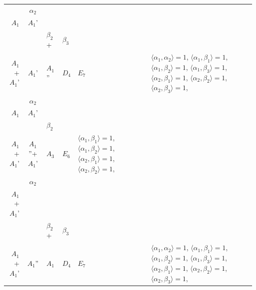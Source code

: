 \documentclass[12pt]{report}
\begin{document}
\begin{appendix}
{\begin{longtable}{rcl p{1cm}p{1cm}p{3cm} }
\begin{tabular}{cc}$\alpha_1$+ & $\alpha_2$\\\tiny{ $A_1$ } & \tiny{ $A_1$' }\end{tabular} &\begin{tabular}{c} = \\~ \end{tabular} & \begin{tabular}{ccc}$\beta_1$+ & $\beta_2$+ & $\beta_3$\\\tiny{ $A_1$+$A_1$' } & \tiny{ $A_1$' } & \tiny{ $A_1$'' }\end{tabular} & $D_4$ & $E_7$ & $\langle\alpha_1, \alpha_2\rangle=1$,  $\langle\alpha_1, \beta_1\rangle=1$, $\langle\alpha_1, \beta_2\rangle=1$, $\langle\alpha_1, \beta_3\rangle=1$, $\langle\alpha_2, \beta_1\rangle=1$, $\langle\alpha_2, \beta_2\rangle=1$, $\langle\alpha_2, \beta_3\rangle=1$, 
\\
\begin{tabular}{cc}$\alpha_1$+ & $\alpha_2$\\\tiny{ $A_1$ } & \tiny{ $A_1$' }\end{tabular} &\begin{tabular}{c} = \\~ \end{tabular} & \begin{tabular}{cc}$\beta_1$+ & $\beta_2$\\\tiny{ $A_1$+$A_1$' } & \tiny{ $A_1$''+$A_1$' }\end{tabular} & $A_3$ & $E_6$ &  $\langle\alpha_1, \beta_1\rangle=1$, $\langle\alpha_1, \beta_2\rangle=1$, $\langle\alpha_2, \beta_1\rangle=1$, $\langle\alpha_2, \beta_2\rangle=1$, 
\\
\begin{tabular}{cc}$\alpha_1$+ & $\alpha_2$\\\tiny{ $A_1$+$A_1$' } & \tiny{  }\end{tabular} &\begin{tabular}{c} = \\~ \end{tabular} & \begin{tabular}{ccc}$\beta_1$+ & $\beta_2$+ & $\beta_3$\\\tiny{ $A_1$+$A_1$' } & \tiny{ $A_1$'' } & \tiny{ $A_1$ }\end{tabular} & $D_4$ & $E_7$ & $\langle\alpha_1, \alpha_2\rangle=1$,  $\langle\alpha_1, \beta_1\rangle=1$, $\langle\alpha_1, \beta_2\rangle=1$, $\langle\alpha_1, \beta_3\rangle=1$, $\langle\alpha_2, \beta_1\rangle=1$, $\langle\alpha_2, \beta_2\rangle=1$, $\langle\alpha_2, \beta_3\rangle=1$, 

\end{longtable}}
\end{appendix}
\end{document}
